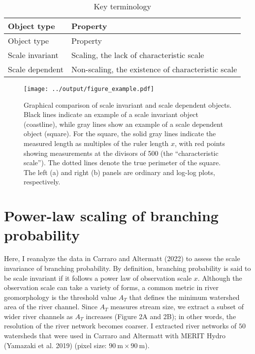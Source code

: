 \documentclass[
  12pt,
]{article}
\begin{document}
\begin{longtable}[]{@{}ll@{}}
\caption{Key terminology}\tabularnewline
\toprule()
Object type & Property \\
\midrule()
\endfirsthead
\toprule()
Object type & Property \\
\midrule()
\endhead
Scale invariant & Scaling, the lack of characteristic scale \\
Scale dependent & Non-scaling, the existence of characteristic scale \\
\bottomrule()
\end{longtable}

\begin{figure}
\centering
\texttt{[image: ../output/figure\_example.pdf]}
\caption{\label{fig:example}Graphical comparison of scale invariant and scale dependent objects. Black lines indicate an example of a scale invariant object (coastline), while gray lines show an example of a scale dependent object (square). For the square, the solid gray lines indicate the measured length as multiples of the ruler length \(x\), with red points showing measurements at the divisors of 500 (the ``characteristic scale''). The dotted lines denote the true perimeter of the square. The left (a) and right (b) panels are ordinary and log-log plots, respectively.}
\end{figure}

\hypertarget{power-law-scaling-of-branching-probability}{%
\section{Power-law scaling of branching probability}\label{power-law-scaling-of-branching-probability}}

Here, I reanalyze the data in Carraro and Altermatt (2022) to assess the scale invariance of branching probability. By definition, branching probability is said to be scale invariant if it follows a power law of observation scale \(x\). Although the observation scale can take a variety of forms, a common metric in river geomorphology is the threshold value \(A_T\) that defines the minimum watershed area of the river channel. Since \(A_T\) measures stream size, we extract a subset of wider river channels as \(A_T\) increases (Figure 2A and 2B); in other words, the resolution of the river network becomes coarser. I extracted river networks of \(50\) watersheds that were used in Carraro and Altermatt with MERIT Hydro (Yamazaki et al. 2019) (pixel size: \(90~\text{m} \times 90~\text{m}\)).
\end{document}
